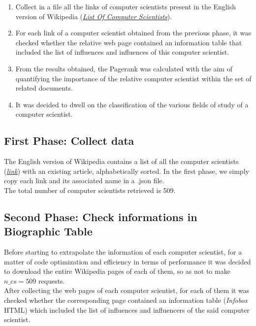 \documentclass[12pt, twoside]{article}
\begin{document}
\begin{enumerate}[noitemsep, topsep=1pt]
	\item Collect in a file all the links of computer scientists present in the English version of Wikipedia (\textit{\href{https://en.wikipedia.org/wiki/List_of_computer_scientists}{List Of Computer Scientists}}).
	\item For each link of a computer scientist obtained from the previous phase, it was checked whether the relative web page contained an information table that included the list of influences and influences of this computer scientist.
	\item From the results obtained, the Pagerank was calculated with the aim of quantifying the importance of the relative computer scientist within the set of related documents.
	\item It was decided to dwell on the classification of the various fields of study of a computer scientist.
\end{enumerate}

\subsection{First Phase: Collect data}
The English version of Wikipedia contains a list of all the computer scientists (\textit{\href{https://en.wikipedia.org/wiki/List_of_computer_scientists}{link}}) with an existing article, alphabetically sorted. In the first phase, we simply copy each link and its associated name in a .json file.\\
The total number of computer scientists retrieved is 509.

\subsection{Second Phase: Check informations in  Biographic Table}
Before starting to extrapolate the information of each computer scientist, for a matter of code optimization and efficiency in terms of performance it was decided to download the entire Wikipedia pages of each of them, so as not to make $ n\_cs =  509$ requests. \\
After collecting the web pages of each computer scientist, for each of them it was checked whether the corresponding page contained an information table (\textit{Infobox} HTML) which included the list of influences and influencers of the said computer scientist.
\end{document}
